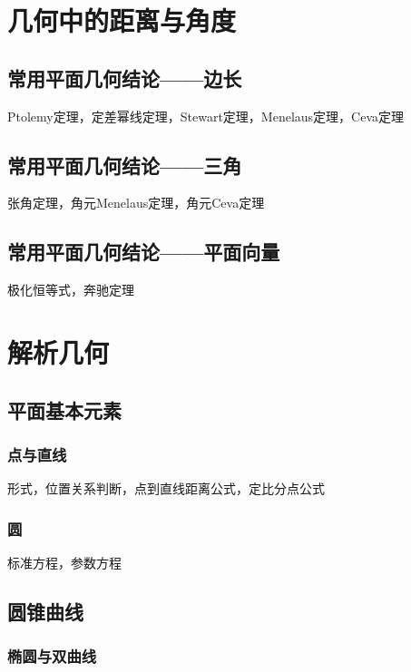 \documentclass[lang=cn, zihao=4.5]{elegantbook}
\begin{document}
\chapter{几何中的距离与角度}

\section{常用平面几何结论——边长}

Ptolemy定理，定差幂线定理，Stewart定理，Menelaus定理，Ceva定理

\section{常用平面几何结论——三角}

张角定理，角元Menelaus定理，角元Ceva定理

\section{常用平面几何结论——平面向量}

极化恒等式，奔驰定理

\chapter{解析几何}

\section{平面基本元素}

\subsection{点与直线}

形式，位置关系判断，点到直线距离公式，定比分点公式

\subsection{圆}

标准方程，参数方程

\section{圆锥曲线}

\subsection{椭圆与双曲线}
\end{document}
